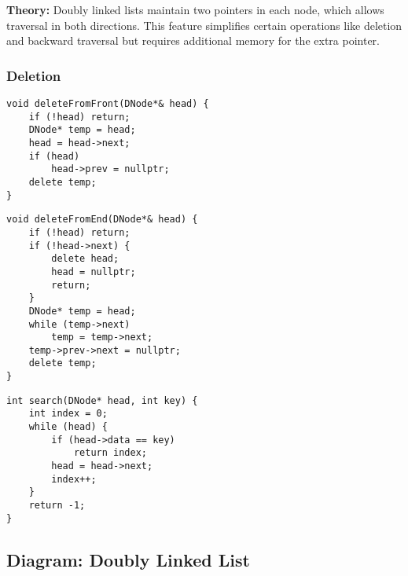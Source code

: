 \textbf{Theory:} Doubly linked lists maintain two pointers in each node, which allows traversal in both directions. This feature simplifies certain operations like deletion and backward traversal but requires additional memory for the extra pointer.

\subsubsection{Deletion}
\begin{lstlisting}[style=cppstyle, caption={Delete from Front in Doubly Linked List}]
void deleteFromFront(DNode*& head) {
    if (!head) return;
    DNode* temp = head;
    head = head->next;
    if (head)
        head->prev = nullptr;
    delete temp;
}
\end{lstlisting}

\begin{lstlisting}[style=cppstyle, caption={Delete from End in Doubly Linked List}]
void deleteFromEnd(DNode*& head) {
    if (!head) return;
    if (!head->next) {
        delete head;
        head = nullptr;
        return;
    }
    DNode* temp = head;
    while (temp->next)
        temp = temp->next;
    temp->prev->next = nullptr;
    delete temp;
}
\end{lstlisting}

\begin{lstlisting}[style=cppstyle, caption={Search in Doubly Linked List}]
int search(DNode* head, int key) {
    int index = 0;
    while (head) {
        if (head->data == key)
            return index;
        head = head->next;
        index++;
    }
    return -1;
}
\end{lstlisting}

\subsection{Diagram: Doubly Linked List}
\begin{center}
\end{center}

